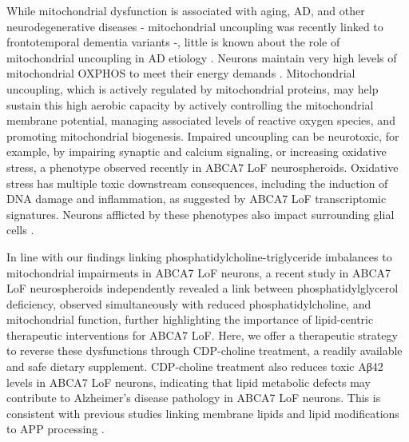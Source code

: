 While mitochondrial dysfunction is associated with aging, AD, and other neurodegenerative diseases - mitochondrial uncoupling was recently linked to frontotemporal dementia variants\cite{noauthor_2022-os} -, little is known about the role of mitochondrial uncoupling in AD etiology \cite{Bano2023-qz,Zong2024-tn,Demine2019-qj,noauthor_2013-rt,Picca2023-gt}. Neurons maintain very high levels of mitochondrial OXPHOS to meet their energy demands\cite{Morant-Ferrando2023-va,Trigo2022-ym} . Mitochondrial uncoupling, which is actively regulated by mitochondrial proteins\cite{Park2023-fa,noauthor_2016-fg}, may help sustain this high aerobic capacity by actively controlling the mitochondrial membrane potential, managing associated levels of reactive oxygen species\cite{Demine2019-qj,Shadel2015-kt}, and promoting mitochondrial biogenesis\cite{Korshunov1997-aj,Wisloff2005-ho,Andrews2005-yy,noauthor_2022-vx}. Impaired uncoupling can be neurotoxic\cite{Korshunov1997-aj,Wisloff2005-ho,Andrews2005-yy,noauthor_2022-vx}, for example, by impairing synaptic and calcium signaling, or increasing  oxidative stress, a phenotype observed recently in ABCA7 LoF neurospheroids\cite{Kawatani2023-vf}. Oxidative stress has multiple toxic downstream consequences, including the induction of DNA damage and inflammation, as suggested by ABCA7 LoF transcriptomic signatures\cite{Robert2020-sc,Volanti2002-mc,Canty1999-oj,Schreck1992-zr}. Neurons afflicted by these phenotypes also impact surrounding glial cells \cite{Byrns2024-id,Welch2022-ef}. 

In line with our findings linking phosphatidylcholine-triglyceride imbalances to mitochondrial impairments in ABCA7 LoF neurons, a recent study in ABCA7 LoF neurospheroids independently revealed a link between phosphatidylglycerol deficiency, observed simultaneously with reduced phosphatidylcholine, and mitochondrial function\cite{Kawatani2023-vf}, further highlighting the importance of lipid-centric therapeutic interventions for ABCA7 LoF. Here, we offer a therapeutic strategy to reverse these dysfunctions through CDP-choline treatment, a readily available and safe dietary supplement\cite{Gavrilova2018-oi,Zeisel2009-xv,Blusztajn2017-nv}. CDP-choline treatment also reduces toxic Aβ42 levels in ABCA7 LoF neurons, indicating that lipid metabolic defects may contribute to Alzheimer’s disease pathology in ABCA7 LoF neurons. This is consistent with previous studies linking membrane lipids and lipid modifications to APP processing \cite{Bhattacharyya2016-rs,Walter2013-qu}. 


